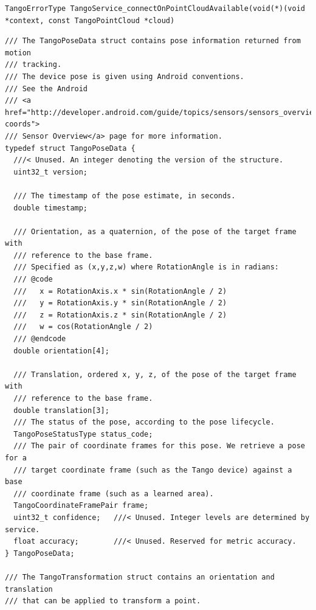 \documentclass[12pt,twoside]{article}
\begin{document}
\begin{lstlisting}
TangoErrorType TangoService_connectOnPointCloudAvailable(void(*)(void *context, const TangoPointCloud *cloud) 
\end{lstlisting}

\begin{lstlisting}
/// The TangoPoseData struct contains pose information returned from motion
/// tracking.
/// The device pose is given using Android conventions.
/// See the Android
/// <a href="http://developer.android.com/guide/topics/sensors/sensors_overview.html#sensors-coords">
/// Sensor Overview</a> page for more information.
typedef struct TangoPoseData {
  ///< Unused. An integer denoting the version of the structure.
  uint32_t version;

  /// The timestamp of the pose estimate, in seconds.
  double timestamp;

  /// Orientation, as a quaternion, of the pose of the target frame with
  /// reference to the base frame.
  /// Specified as (x,y,z,w) where RotationAngle is in radians:
  /// @code
  ///   x = RotationAxis.x * sin(RotationAngle / 2)
  ///   y = RotationAxis.y * sin(RotationAngle / 2)
  ///   z = RotationAxis.z * sin(RotationAngle / 2)
  ///   w = cos(RotationAngle / 2)
  /// @endcode
  double orientation[4];

  /// Translation, ordered x, y, z, of the pose of the target frame with
  /// reference to the base frame.
  double translation[3];
  /// The status of the pose, according to the pose lifecycle.
  TangoPoseStatusType status_code;
  /// The pair of coordinate frames for this pose. We retrieve a pose for a
  /// target coordinate frame (such as the Tango device) against a base
  /// coordinate frame (such as a learned area).
  TangoCoordinateFramePair frame;
  uint32_t confidence;   ///< Unused. Integer levels are determined by service.
  float accuracy;        ///< Unused. Reserved for metric accuracy.
} TangoPoseData;

/// The TangoTransformation struct contains an orientation and translation
/// that can be applied to transform a point.
\end{lstlisting}
\end{document}
